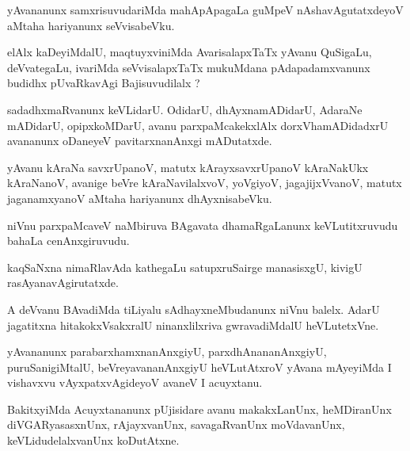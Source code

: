 \documentclass{article}
\begin{document}
\begin{mn}%
yAvananunx samxrisuvudariMda mahApApagaLa guMpeV nAshavAgutatxdeyoV aMtaha hariyanunx 
seVvisabeVku.
\end{mn}

\begin{mn}%
elAlx kaDeyiMdalU, maqtuyxviniMda AvarisalapxTaTx yAvanu QuSigaLu, deVvategaLu, ivariMda 
seVvisalapxTaTx mukuMdana pAdapadamxvanunx budidhx pUvaRkavAgi Bajisuvudilalx ?
\end{mn}

\begin{mn}%
sadadhxmaRvanunx keVLidarU. OdidarU, dhAyxnamADidarU, AdaraNe mADidarU, opipxkoMDarU, 
avanu parxpaMcakekxlAlx dorxVhamADidadxrU avananunx oDaneyeV pavitarxnanAnxgi mADutatxde.
\end{mn}

\begin{mn}%
yAvanu kAraNa savxrUpanoV, matutx kArayxsavxrUpanoV kAraNakUkx kAraNanoV, avanige beVre 
kAraNavilalxvoV,  yoVgiyoV, jagajijxVvanoV, matutx jaganamxyanoV aMtaha hariyanunx 
dhAyxnisabeVku.
\end{mn}

\begin{mn}%
niVnu parxpaMcaveV naMbiruva BAgavata dhamaRgaLanunx keVLutitxruvudu bahaLa cenAnxgiruvudu.
\end{mn}

\begin{mn}%
kaqSaNxna  nimaRlavAda kathegaLu satupxruSairge manasisxgU, kivigU rasAyanavAgirutatxde.
\end{mn}

\begin{mn}%
A deVvanu BAvadiMda tiLiyalu sAdhayxneMbudanunx niVnu balelx. AdarU jagatitxna 
hitakokxVsakxralU ninanxlilxriva gwravadiMdalU heVLutetxVne.
\end{mn}

\begin{mn}%
yAvananunx parabarxhamxnanAnxgiyU, parxdhAnananAnxgiyU, puruSanigiMtalU, 
beVreyavananAnxgiyU heVLutAtxroV yAvana mAyeyiMda I vishavxvu vAyxpatxvAgideyoV avaneV I 
acuyxtanu.
\end{mn}

\begin{mn}%
BakitxyiMda Acuyxtananunx pUjisidare avanu makakxLanUnx, heMDiranUnx diVGARyasasxnUnx, 
rAjayxvanUnx, savagaRvanUnx moVdavanUnx, keVLidudelalxvanUnx koDutAtxne.
\end{mn}
\end{document}
